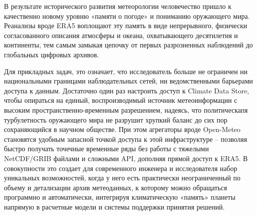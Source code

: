 В результате исторического развития метеорологии человечество пришло к качественно новому уровню «памяти о погоде» и пониманию оружающего мира. 
Реанализы вроде ERA5 воплощают эту память в виде непрерывного, физически согласованного описания атмосферы и океана, охватывающего десятилетия и континенты, тем самым замыкая цепочку от первых разрозненных наблюдений до глобальных цифровых архивов.  

Для прикладных задач, это означает, что исследователь больше не ограничен ни национальными границами наблюдательных сетей, ни ведомственными барьерами доступа к данным.
Достаточно один раз настроить доступ к Climate Data Store, чтобы опираться на единый, воспроизводимый источник метеоинформации с высоким пространственно-временным разрешением, надеясь, что политическапя турбулетность оружающего мира не разрушит хрупкий баланс до сих пор сохраняющийся в научном обществе. 
При этом агрегаторы вроде Open-Meteo становятся удобным запасной точкой доступа к этой инфраструктуре -- позволяя быстро получать точечные временные ряды без работы с тяжелыми NetCDF/GRIB файлами и сложными API, дополняя прямой доступ к ERA5. 
В совокупности это создает для современного инженера и исследователя набор уникальных возможностей, когда у него есть практически неограниченный по объему и детализации архив метеоданных, к которому можно обращаться программно и автоматически, интегрируя климатическую «память» планеты напрямую в расчетные модели и системы поддержки принятия решений.  
